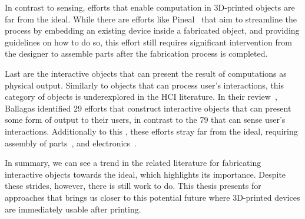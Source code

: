     In contrast to sensing, efforts that enable computation in 3D-printed
    objects are far from the \papf ideal. While there are efforts like
    Pineal~\cite{Ledo:2017} that aim to streamline the process by embedding an
    existing device inside a fabricated object, and providing guidelines on how
    to do so, this effort still requires significant intervention from the
    designer to assemble parts after the fabrication process is completed.

    Last are the interactive objects that can present the result of computations
    as physical output. Similarly to objects that can process user's
    interactions, this category of objects is underexplored in the HCI
    literature. In their review~\cite{Ballagas:2018}, Ballagas \etal identified
    29 efforts that construct interactive objects that can present some form of
    output to their users, in contrast to the 79 that can sense user's
    interactions.  Additionally to this , these efforts
    stray far from the \papf ideal, requiring assembly of parts~\cite{}, and
    electronics~\cite{}.

    In summary, we can see a trend in the related literature for fabricating
    interactive objects towards the \papf ideal, which highlights its
    importance. Despite these strides, however, there is still work to do. This
    thesis presents for approaches that brings us closer to this potential
    future where 3D-printed devices are immediately usable after printing.